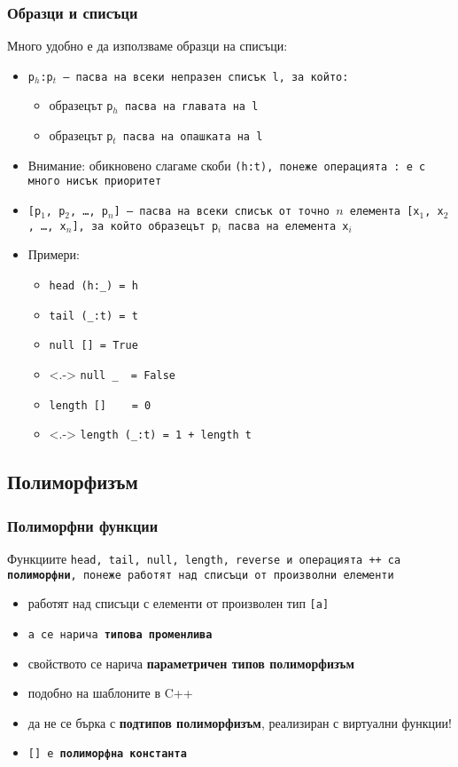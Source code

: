 \documentclass{beamer}
\begin{document}
\begin{frame}[fragile]
  \frametitle{Образци и списъци}

  Много удобно е да използваме образци на списъци:
  \begin{itemize}[<+->]
  \item \tt{p$_h$:p$_t$} --- пасва на всеки непразен списък \tt l, за който:
    \begin{itemize}
    \item образецът \tt{p$_h$} пасва на главата на \tt l
    \item образецът  \tt{p$_t$} пасва на опашката на \tt l
    \end{itemize}
  \item \alert{Внимание:} обикновено слагаме скоби \tt{(h:t)}, понеже операцията \tt: е с много нисък приоритет
  \item \tt{[p$_1$, p$_2$, \ldots, p$_n$]} --- пасва на всеки списък от точно $n$ елемента \tt{[x$_1$, x$_2$, \ldots, x$_n$]}, за който образецът \tt{p$_i$} пасва на елемента \tt{x$_i$}
  \item Примери:
    \begin{itemize}
    \item     \verb#head (h:_) = h#
    \item     \verb#tail (_:t) = t#
    \item     \verb#null [] = True#
    \item<.-> \verb#null _  = False#
    \item     \verb#length []    = 0#
    \item<.-> \verb#length (_:t) = 1 + length t#
    \end{itemize}
  \end{itemize}
\end{frame}

\subsection{Полиморфизъм}

\begin{frame}
  \frametitle{Полиморфни функции}
  Функциите \tt{head}, \tt{tail}, \tt{null}, \tt{length}, \tt{reverse} и операцията \tt{++} са \textbf{полиморфни}, понеже работят над списъци от произволни елементи
  \begin{itemize}[<+->]
  \item работят над списъци с елементи от произволен тип \tt{[a]}
  \item \tt a се нарича \textbf{типова променлива}
  \item свойството се нарича \textbf{параметричен типов полиморфизъм}
  \item подобно на шаблоните в C++
  \item \alert{да не се бърка с \textbf{подтипов полиморфизъм}, реализиран с виртуални функции!}
  \item \tt{[]} е \textbf{полиморфна константа}
  \end{itemize}
\end{frame}
\end{document}
